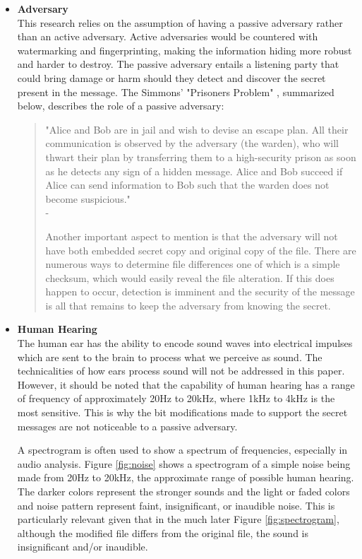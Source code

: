 \documentclass[letterpaper]{article}
\begin{document}
\begin{itemize}

\item \textbf{Adversary}\\
This research relies on the assumption of having a passive adversary rather than an active adversary. Active adversaries would be countered with watermarking and fingerprinting, making the information hiding more robust and harder to destroy. The passive adversary entails a listening party that could bring damage or harm should they detect and discover the secret present in the message. The Simmons' "Prisoners Problem" \cite{simmons1984prisoners}, summarized below, describes the role of a passive adversary: \begin{quotation} 
"Alice and Bob are in jail and wish to devise an escape plan. All their communication
is observed by the adversary (the warden), who will thwart their plan by transferring
them to a high-security prison as soon as he detects any sign of a hidden message. Alice and Bob
succeed if Alice can send information to Bob such that the warden does not become suspicious."\\ - \cite{cachin1998information}

Another important aspect to mention is that the adversary will not have both embedded secret copy and original copy of the file. There are numerous ways to determine file differences one of which is a simple checksum, which would easily reveal the file alteration. If this does happen to occur, detection is imminent and the security of the message is all that remains to keep the adversary from knowing the secret. 
\end{quotation}



\item \textbf{Human Hearing}\\
The human ear has the ability to encode sound waves into electrical impulses which are sent to the brain to process what we perceive as sound. The technicalities of how ears process sound will not be addressed in this paper. However, it should be noted that the capability of human hearing has a range of frequency of approximately 20Hz to 20kHz, where 1kHz to 4kHz is the most sensitive. \cite{digitalprocess} This is why the bit modifications made to support the secret messages are not noticeable to a passive adversary. 

A spectrogram is often used to show a spectrum of frequencies, especially in audio analysis. Figure {\ref{fig:noise}} shows a spectrogram of a simple noise being made from 20Hz to 20kHz, the approximate range of possible human hearing. The darker colors represent the stronger sounds and the light or faded colors and noise pattern represent faint, insignificant, or inaudible noise. This is particularly relevant given that in the much later Figure \ref{fig:spectrogram}, although the modified file differs from the original file, the sound is insignificant and/or inaudible. 


\end{itemize}
\end{document}
